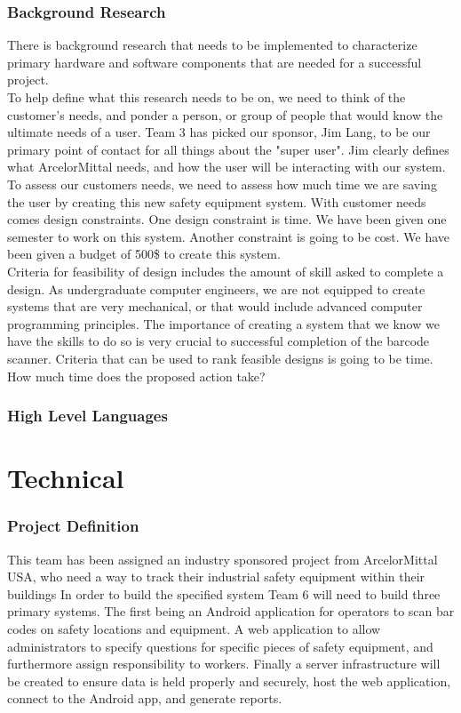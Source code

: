 \documentclass[Letter,11pt]{article}
\begin{document}
\section{Background Research}\label{resarch}
	There is background research that needs to be implemented to characterize primary hardware and software components that are needed for a successful project. \\
	To help define what this research needs to be on, we need to think of the customer's needs, and ponder a person, or group of people that would know the ultimate needs of a user. Team 3 has picked our sponsor, Jim Lang, to be our primary point of contact for all things about the "super user". Jim clearly defines what ArcelorMittal needs, and how the user will be interacting with our system. To assess our customers needs, we need to assess how much time we are saving the user by creating this new safety equipment system. 
	With customer needs comes design constraints. One design constraint is time. We have been given one semester to work on this system. Another constraint is going to be cost. We have been given a budget of 500\$ to create this system.\\ 
	Criteria for feasibility of design includes the amount of skill asked to complete a design. As undergraduate computer engineers, we are not equipped to create systems that are very mechanical, or that would include advanced computer programming principles. The importance of creating a system that we know we have the skills to do so is very crucial to successful completion of the barcode scanner.  
	Criteria that can be used to rank feasible designs is going to be time. How much time does the proposed action take? 

\section{High Level Languages}\label{highlevel}


\part{Technical}
\section{Project Definition}\label{def}
	This team has been assigned an industry sponsored project from ArcelorMittal USA, who need a way to track their industrial safety equipment within their buildings In order to build the specified system Team 6 will need to build three primary systems. The first being an Android application for operators to scan bar codes on safety locations and equipment. A web application to allow administrators to specify questions for specific pieces of safety equipment, and furthermore assign responsibility to workers. Finally a server infrastructure will be created to ensure data is held properly and securely, host the web application, connect to the Android app, and generate reports. 
			
\end{document}
